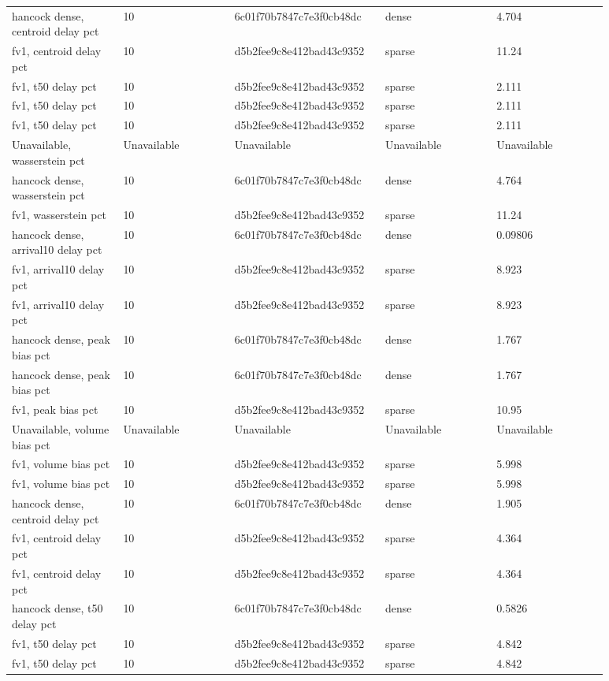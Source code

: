 \begin{longtable}{p{0.1760\linewidth}p{0.1760\linewidth}p{0.1760\linewidth}p{0.1760\linewidth}p{0.1760\linewidth}}
hancock dense, centroid delay pct & 10 & 6c01f70b7847c7e3f0cb48dc & dense & 4.704 \\
fv1, centroid delay pct & 10 & d5b2fee9c8e412bad43c9352 & sparse & 11.24 \\
fv1, t50 delay pct & 10 & d5b2fee9c8e412bad43c9352 & sparse & 2.111 \\
fv1, t50 delay pct & 10 & d5b2fee9c8e412bad43c9352 & sparse & 2.111 \\
fv1, t50 delay pct & 10 & d5b2fee9c8e412bad43c9352 & sparse & 2.111 \\
Unavailable, wasserstein pct & Unavailable & Unavailable & Unavailable & Unavailable \\
hancock dense, wasserstein pct & 10 & 6c01f70b7847c7e3f0cb48dc & dense & 4.764 \\
fv1, wasserstein pct & 10 & d5b2fee9c8e412bad43c9352 & sparse & 11.24 \\
hancock dense, arrival10 delay pct & 10 & 6c01f70b7847c7e3f0cb48dc & dense & 0.09806 \\
fv1, arrival10 delay pct & 10 & d5b2fee9c8e412bad43c9352 & sparse & 8.923 \\
fv1, arrival10 delay pct & 10 & d5b2fee9c8e412bad43c9352 & sparse & 8.923 \\
hancock dense, peak bias pct & 10 & 6c01f70b7847c7e3f0cb48dc & dense & 1.767 \\
hancock dense, peak bias pct & 10 & 6c01f70b7847c7e3f0cb48dc & dense & 1.767 \\
fv1, peak bias pct & 10 & d5b2fee9c8e412bad43c9352 & sparse & 10.95 \\
Unavailable, volume bias pct & Unavailable & Unavailable & Unavailable & Unavailable \\
fv1, volume bias pct & 10 & d5b2fee9c8e412bad43c9352 & sparse & 5.998 \\
fv1, volume bias pct & 10 & d5b2fee9c8e412bad43c9352 & sparse & 5.998 \\
hancock dense, centroid delay pct & 10 & 6c01f70b7847c7e3f0cb48dc & dense & 1.905 \\
fv1, centroid delay pct & 10 & d5b2fee9c8e412bad43c9352 & sparse & 4.364 \\
fv1, centroid delay pct & 10 & d5b2fee9c8e412bad43c9352 & sparse & 4.364 \\
hancock dense, t50 delay pct & 10 & 6c01f70b7847c7e3f0cb48dc & dense & 0.5826 \\
fv1, t50 delay pct & 10 & d5b2fee9c8e412bad43c9352 & sparse & 4.842 \\
fv1, t50 delay pct & 10 & d5b2fee9c8e412bad43c9352 & sparse & 4.842 \\

\end{longtable}
